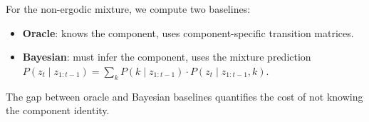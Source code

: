 For the non-ergodic mixture, we compute two baselines:
\begin{itemize}
    \item \textbf{Oracle}: knows the component, uses component-specific transition matrices.
    \item \textbf{Bayesian}: must infer the component, uses the mixture prediction $P(z_t \mid z_{1:t-1}) = \sum_k P(k \mid z_{1:t-1}) \cdot P(z_t \mid z_{1:t-1}, k)$.
\end{itemize}
The gap between oracle and Bayesian baselines quantifies the cost of not knowing the component identity.

